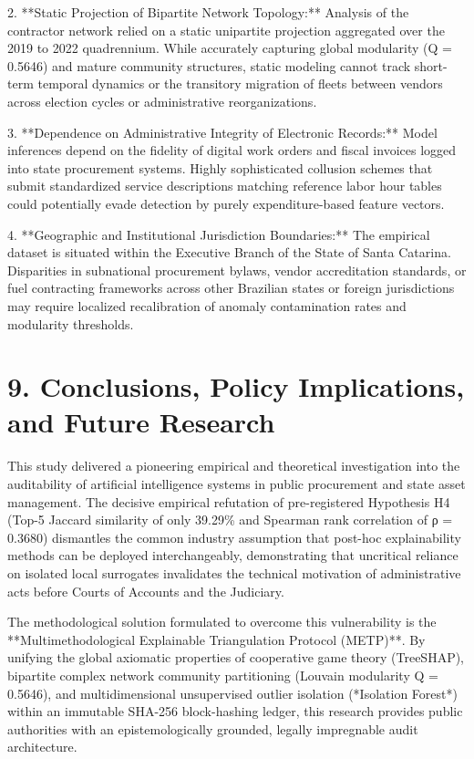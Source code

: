\documentclass[10pt,a4paper,journal]{article}
\begin{document}
2. **Static Projection of Bipartite Network Topology:** Analysis of the contractor network relied on a static unipartite projection aggregated over the 2019 to 2022 quadrennium. While accurately capturing global modularity (Q = 0.5646) and mature community structures, static modeling cannot track short-term temporal dynamics or the transitory migration of fleets between vendors across election cycles or administrative reorganizations.

3. **Dependence on Administrative Integrity of Electronic Records:** Model inferences depend on the fidelity of digital work orders and fiscal invoices logged into state procurement systems. Highly sophisticated collusion schemes that submit standardized service descriptions matching reference labor hour tables could potentially evade detection by purely expenditure-based feature vectors.

4. **Geographic and Institutional Jurisdiction Boundaries:** The empirical dataset is situated within the Executive Branch of the State of Santa Catarina. Disparities in subnational procurement bylaws, vendor accreditation standards, or fuel contracting frameworks across other Brazilian states or foreign jurisdictions may require localized recalibration of anomaly contamination rates and modularity thresholds.

\section{9. Conclusions, Policy Implications, and Future Research}
This study delivered a pioneering empirical and theoretical investigation into the auditability of artificial intelligence systems in public procurement and state asset management. The decisive empirical refutation of pre-registered Hypothesis H4 (Top-5 Jaccard similarity of only 39.29\% and Spearman rank correlation of ρ = 0.3680) dismantles the common industry assumption that post-hoc explainability methods can be deployed interchangeably, demonstrating that uncritical reliance on isolated local surrogates invalidates the technical motivation of administrative acts before Courts of Accounts and the Judiciary.

The methodological solution formulated to overcome this vulnerability is the **Multimethodological Explainable Triangulation Protocol (METP)**. By unifying the global axiomatic properties of cooperative game theory (TreeSHAP), bipartite complex network community partitioning (Louvain modularity Q = 0.5646), and multidimensional unsupervised outlier isolation (*Isolation Forest*) within an immutable SHA-256 block-hashing ledger, this research provides public authorities with an epistemologically grounded, legally impregnable audit architecture.
\end{document}
